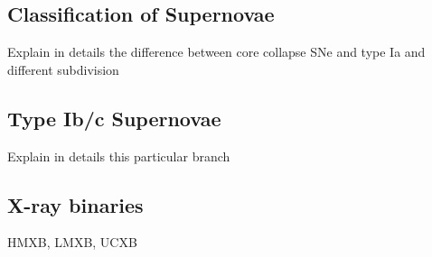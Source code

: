 \documentclass[../../main/thesis_msc.tex]{subfiles}
\begin{document}
			\subsection{Classification of Supernovae}
			
				Explain in details the difference between core collapse SNe and type Ia and different subdivision
				
			\subsection{Type Ib/c Supernovae}
			
				Explain in details this particular branch
				
			\subsection{X-ray binaries}
			
				HMXB, LMXB, UCXB
    
    
    
\end{document}
